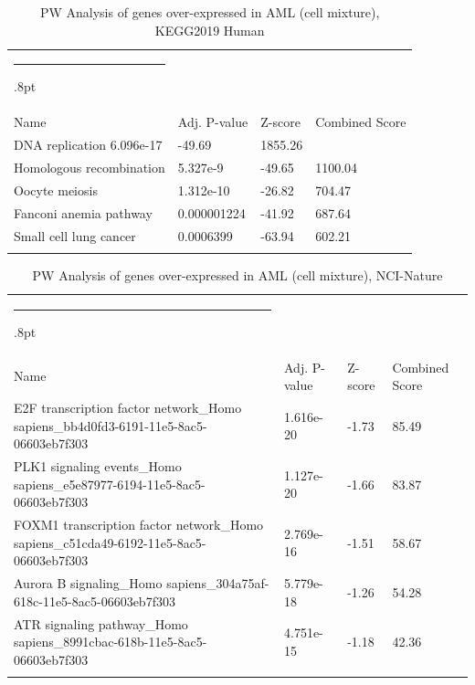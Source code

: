 \documentclass[3p,authoryear,preprint,12pt]{elsarticle}
\makeatletter
\def\hlinewd#1{%
  \noalign{\ifnum0=`}\fi\hrule \@height #1%
  \futurelet\reserved@a\@xhline}
\def\tbltoprule{\hlinewd{.8pt}\\[-12pt]}
\def\tblbottomrule{\noalign{\vspace*{6pt}}\hline\noalign{\vspace*{2pt}}}
\def\tblmidrule{\noalign{\vspace*{6pt}}\hline\noalign{\vspace*{2pt}}}
\makeatother
\begin{document}
\begin{table}[!htbp]
	\caption{{PW Analysis of genes over-expressed in AML (cell mixture), KEGG2019 Human} }
	\label{tw-de478ae31co6}
	\def\arraystretch{1}
	\ignorespaces 
	\centering 
	\begin{tabulary}{\linewidth}{p{\dimexpr.65\tabcolsep}p{\dimexpr.15\tabcolsep}p{\dimexpr.1\tabcolsep}p{\dimexpr.1\tabcolsep}}
		\tbltoprule Name & Adj. P-value & Z-score & Combined Score\\
		\tblmidrule
DNA replication	6.096e-17 & -49.69 & 1855.26 &  \\
Homologous recombination & 5.327e-9 & -49.65 & 1100.04 \\
Oocyte meiosis & 1.312e-10 & -26.82 & 704.47 \\
Fanconi anemia pathway & 0.000001224 & -41.92 & 687.64 \\
Small cell lung cancer & 0.0006399 & -63.94 & 602.21 \\
		\tblbottomrule
	\end{tabulary}\par 
\end{table}
\begin{table}[!htbp]
	\caption{{PW Analysis of genes over-expressed in AML (cell mixture), NCI-Nature} }
	\label{tw-de478ae31cp6}
	\def\arraystretch{1}
	\ignorespaces 
	\centering 
	\begin{tabulary}{\linewidth}{p{\dimexpr.65\tabcolsep}p{\dimexpr.15\tabcolsep}p{\dimexpr.1\tabcolsep}p{\dimexpr.1\tabcolsep}}
		\tbltoprule Name & Adj. P-value & Z-score & Combined Score\\
		\tblmidrule
E2F transcription factor network\_Homo sapiens\_bb4d0fd3-6191-11e5-8ac5-06603eb7f303 & 1.616e-20 & -1.73 & 85.49 \\
PLK1 signaling events\_Homo sapiens\_e5e87977-6194-11e5-8ac5-06603eb7f303 & 1.127e-20 & -1.66 & 83.87 \\
FOXM1 transcription factor network\_Homo sapiens\_c51cda49-6192-11e5-8ac5-06603eb7f303 & 2.769e-16 & -1.51 & 58.67 \\
Aurora B signaling\_Homo sapiens\_304a75af-618c-11e5-8ac5-06603eb7f303 & 5.779e-18 & -1.26 & 54.28 \\
ATR signaling pathway\_Homo sapiens\_8991cbac-618b-11e5-8ac5-06603eb7f303 & 4.751e-15 & -1.18 & 42.36 \\
		\tblbottomrule
	\end{tabulary}\par 
\end{table}
\end{document}
